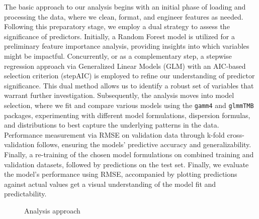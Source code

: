 \documentclass[12pt, twoside,hidelinks]{article}
\theoremstyle{definition}
\numberwithin{equation}{section}
\begin{document}
The basic approach to our analysis begins with an initial phase of loading and processing the data, where we clean, format, and engineer features as needed. Following this preparatory stage, we employ a dual strategy to assess the significance of predictors. Initially, a Random Forest model is utilized for a preliminary feature importance analysis, providing insights into which variables might be impactful. Concurrently, or as a complementary step, a stepwise regression approach via Generalized Linear Models (GLM) with an AIC-based selection criterion (stepAIC) is employed to refine our understanding of predictor significance. This dual method allows us to identify a robust set of variables that warrant further investigation. Subsequently, the analysis moves into model selection, where we fit and compare various models using the \texttt{gamm4} and \texttt{glmmTMB} packages, experimenting with different model formulations, dispersion formulas, and distributions to best capture the underlying patterns in the data. Performance measurement via RMSE on validation data through k-fold cross-validation follows, ensuring the models' predictive accuracy and generalizability. Finally, a re-training of the chosen model formulations on combined training and validation datasets, followed by predictions on the test set. Finally, we evaluate the model's performance using RMSE, accompanied by plotting predictions against actual values get a visual understanding of the model fit and predictability.

\begin{figure}[H]
\centering
{}
\caption{Analysis approach}
\label{fig:analysis_approach}
\end{figure}
\end{document}
